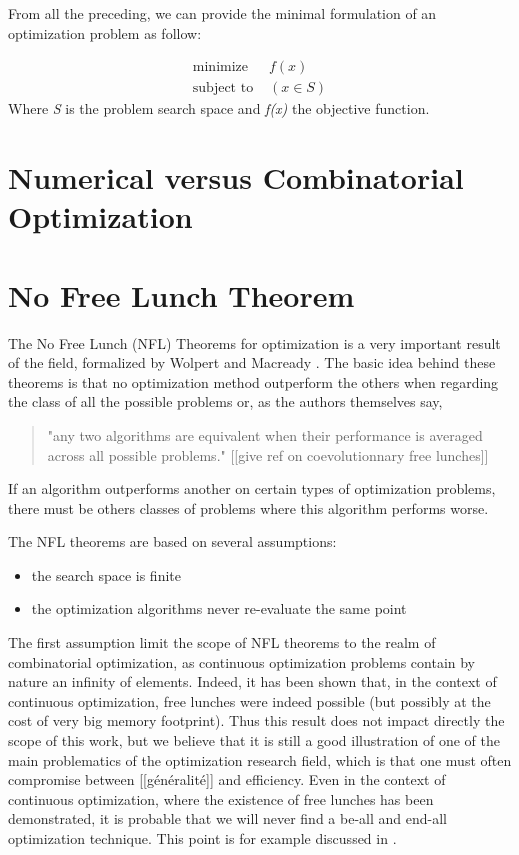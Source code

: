 From all the preceding, we can provide the minimal formulation of an optimization problem as follow:

\begin{align*}
\text{minimize } &f(x) \\
\text{subject to } &(x \in S)
\end{align*}
Where \emph{S} is the problem search space and \emph{f(x)} the objective function.

\section{Numerical versus Combinatorial Optimization}

\section{No Free Lunch Theorem}

The No Free Lunch (NFL) Theorems for optimization is a very important result of the field, formalized by Wolpert and Macready \cite{585893}. The basic idea behind these theorems is that no optimization method outperform the others when regarding the class of all the possible problems or, as the authors themselves say,
\begin{quote}
"any two algorithms are equivalent when their performance is averaged across all possible problems." [[give ref on coevolutionnary free lunches]]
\end{quote}
If an algorithm outperforms another on certain types of optimization problems, there must be others classes of problems where this algorithm performs worse.

The NFL theorems are based on several assumptions:
\begin{itemize}

\item the search space is finite

\item the optimization algorithms never re-evaluate the same point

\end{itemize}

The first assumption limit the scope of NFL theorems to the realm of combinatorial optimization, as continuous optimization problems contain by nature an infinity of elements. Indeed, it has been shown that, in the context of continuous optimization, free lunches were indeed possible \cite{Auger-s00453-008-9244-5} (but possibly at the cost of very big memory footprint). Thus this result does not impact directly the scope of this work, but we believe that it is still a good illustration of one of the main problematics of the optimization research field, which is that one must often compromise between [[généralité]] and efficiency. Even in the context of continuous optimization, where the existence of free lunches has been demonstrated, it is probable that we will never find a be-all and end-all optimization technique. This point is for example discussed in \cite{Doe05}.

